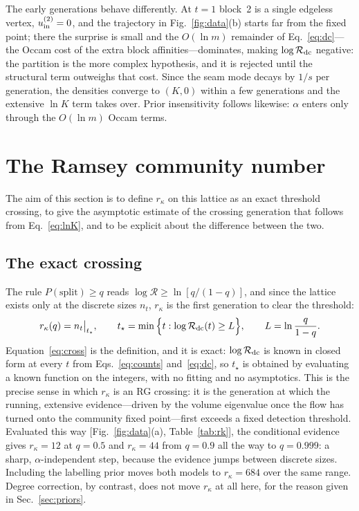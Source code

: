 \documentclass[preprint,12pt]{elsarticle}
\newcommand{\Rev}{\mathcal{R}}
\newcommand{\logR}{\log \Rev}
\newcommand{\rk}{r_{\kappa}}
\newcommand{\Nof}{n_t}
\begin{document}
The early generations behave differently. At $t=1$ block~2 is a single
edgeless vertex, $u_{\rm in}^{(2)}=0$, and the trajectory in
Fig.~\ref{fig:data}(b) starts far from the fixed point; there the surprise is
small and the $O(\ln m)$ remainder of Eq.~\eqref{eq:dc}---the Occam cost of
the extra block affinities---dominates, making $\logR_{\rm dc}$ negative: the
partition is the more complex hypothesis, and it is rejected until the
structural term outweighs that cost. Since the seam mode decays by $1/s$ per
generation, the densities converge to $(K,0)$ within a few generations and the extensive $\ln K$ term takes over. Prior
insensitivity follows likewise: $\alpha$ enters only through the $O(\ln m)$
Occam terms.

\section{The Ramsey community number}
\label{sec:rk}

The aim of this section is to define $\rk$ on this lattice as an exact
threshold crossing, to give the asymptotic estimate of the crossing generation
that follows from Eq.~\eqref{eq:lnK}, and to be explicit about the difference
between the two.

\subsection{The exact crossing}

The rule $P(\text{split})\ge q$ reads $\logR\ge\ln[q/(1{-}q)]$, and since the
lattice exists only at the discrete sizes $\Nof$, $\rk$ is the first generation
to clear the threshold:
\begin{equation}
  \rk(q)=\Nof\big|_{t_\star}, \qquad
  t_\star=\min\Big\{t:\logR_{\rm dc}(t)\ge L\Big\},
  \qquad L=\ln\frac{q}{1-q}.
  \label{eq:cross}
\end{equation}
Equation~\eqref{eq:cross} is the definition, and it is exact: $\logR_{\rm dc}$
is known in closed form at every $t$ from Eqs.~\eqref{eq:counts}
and~\eqref{eq:dc}, so $t_\star$ is obtained by evaluating a known function on
the integers, with no fitting and no asymptotics. This is the precise sense in
which $\rk$ is an RG crossing: it is the generation at which the running,
extensive evidence---driven by the volume eigenvalue once the flow has turned
onto the community fixed point---first exceeds a fixed detection threshold.
Evaluated this way [Fig.~\ref{fig:data}(a), Table~\ref{tab:rk}], the
conditional evidence gives $\rk=12$ at $q=0.5$ and $\rk=44$ from $q=0.9$ all
the way to $q=0.999$: a sharp, $\alpha$-independent step, because the evidence
jumps between discrete sizes. Including the labelling prior moves both models
to $\rk=684$ over the same range. Degree correction, by contrast, does not move
$\rk$ at all here, for the reason given in Sec.~\ref{sec:priors}.
\end{document}

